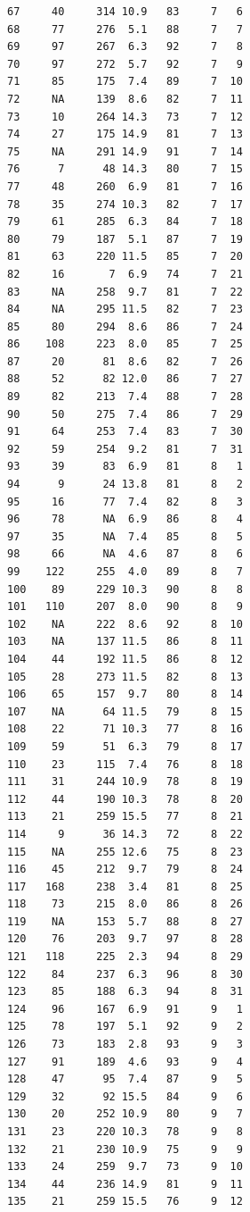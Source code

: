 \documentclass[
  letterpaper,
  DIV=11,
  numbers=noendperiod]{scrreprt}
\begin{document}
\begin{verbatim}
67     40     314 10.9   83     7   6
68     77     276  5.1   88     7   7
69     97     267  6.3   92     7   8
70     97     272  5.7   92     7   9
71     85     175  7.4   89     7  10
72     NA     139  8.6   82     7  11
73     10     264 14.3   73     7  12
74     27     175 14.9   81     7  13
75     NA     291 14.9   91     7  14
76      7      48 14.3   80     7  15
77     48     260  6.9   81     7  16
78     35     274 10.3   82     7  17
79     61     285  6.3   84     7  18
80     79     187  5.1   87     7  19
81     63     220 11.5   85     7  20
82     16       7  6.9   74     7  21
83     NA     258  9.7   81     7  22
84     NA     295 11.5   82     7  23
85     80     294  8.6   86     7  24
86    108     223  8.0   85     7  25
87     20      81  8.6   82     7  26
88     52      82 12.0   86     7  27
89     82     213  7.4   88     7  28
90     50     275  7.4   86     7  29
91     64     253  7.4   83     7  30
92     59     254  9.2   81     7  31
93     39      83  6.9   81     8   1
94      9      24 13.8   81     8   2
95     16      77  7.4   82     8   3
96     78      NA  6.9   86     8   4
97     35      NA  7.4   85     8   5
98     66      NA  4.6   87     8   6
99    122     255  4.0   89     8   7
100    89     229 10.3   90     8   8
101   110     207  8.0   90     8   9
102    NA     222  8.6   92     8  10
103    NA     137 11.5   86     8  11
104    44     192 11.5   86     8  12
105    28     273 11.5   82     8  13
106    65     157  9.7   80     8  14
107    NA      64 11.5   79     8  15
108    22      71 10.3   77     8  16
109    59      51  6.3   79     8  17
110    23     115  7.4   76     8  18
111    31     244 10.9   78     8  19
112    44     190 10.3   78     8  20
113    21     259 15.5   77     8  21
114     9      36 14.3   72     8  22
115    NA     255 12.6   75     8  23
116    45     212  9.7   79     8  24
117   168     238  3.4   81     8  25
118    73     215  8.0   86     8  26
119    NA     153  5.7   88     8  27
120    76     203  9.7   97     8  28
121   118     225  2.3   94     8  29
122    84     237  6.3   96     8  30
123    85     188  6.3   94     8  31
124    96     167  6.9   91     9   1
125    78     197  5.1   92     9   2
126    73     183  2.8   93     9   3
127    91     189  4.6   93     9   4
128    47      95  7.4   87     9   5
129    32      92 15.5   84     9   6
130    20     252 10.9   80     9   7
131    23     220 10.3   78     9   8
132    21     230 10.9   75     9   9
133    24     259  9.7   73     9  10
134    44     236 14.9   81     9  11
135    21     259 15.5   76     9  12

\end{verbatim}
\end{document}
